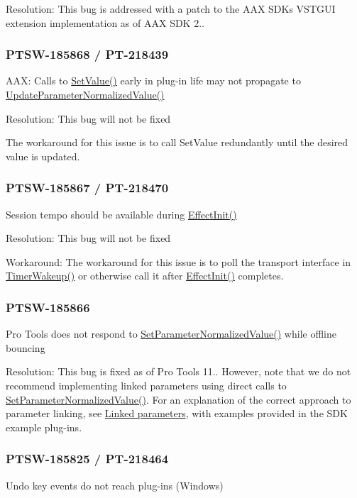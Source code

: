 Resolution\+: This bug is addressed with a patch to the A\+A\+X S\+D\+K\textquotesingle{}s V\+S\+T\+G\+U\+I extension implementation as of A\+A\+X S\+D\+K 2..\hypertarget{a00374_PTSW-185868}{}\subsubsection{P\+T\+S\+W-\/185868 / P\+T-\/218439}\label{a00374_PTSW-185868}
A\+A\+X\+: Calls to \hyperlink{a00033_a4dd6d99de8dc4440bac3ae4eefa19f94}{Set\+Value()} early in plug-\/in life may not propagate to \hyperlink{a00061_a685858711efb8634ce66c327f2865c71}{Update\+Parameter\+Normalized\+Value()}

Resolution\+: This bug will not be fixed

The workaround for this issue is to call Set\+Value redundantly until the desired value is updated.\hypertarget{a00374_PTSW-185867}{}\subsubsection{P\+T\+S\+W-\/185867 / P\+T-\/218470}\label{a00374_PTSW-185867}
Session tempo should be available during \hyperlink{a00018_a2e302fd758d39a6a855023bf825fe148}{Effect\+Init()}

Resolution\+: This bug will not be fixed

Workaround\+: The workaround for this issue is to poll the transport interface in \hyperlink{a00061_ab5b8da9e1a9d778d327ac04f4ab8d139}{Timer\+Wakeup()} or otherwise call it after \hyperlink{a00018_a2e302fd758d39a6a855023bf825fe148}{Effect\+Init()} completes.\hypertarget{a00374_PTSW-185866}{}\subsubsection{P\+T\+S\+W-\/185866}\label{a00374_PTSW-185866}
Pro Tools does not respond to \hyperlink{a00061_a368b0f5a761d1eda4c41b420f153a077}{Set\+Parameter\+Normalized\+Value()} while offline bouncing

Resolution\+: This bug is fixed as of Pro Tools 11.. However, note that we do not recommend implementing linked parameters using direct calls to \hyperlink{a00061_a368b0f5a761d1eda4c41b420f153a077}{Set\+Parameter\+Normalized\+Value()}. For an explanation of the correct approach to parameter linking, see \hyperlink{a00354}{Linked parameters}, with examples provided in the S\+D\+K example plug-\/ins.\hypertarget{a00374_PTSW-185825}{}\subsubsection{P\+T\+S\+W-\/185825 / P\+T-\/218464}\label{a00374_PTSW-185825}
Undo key events do not reach plug-\/ins (Windows)

